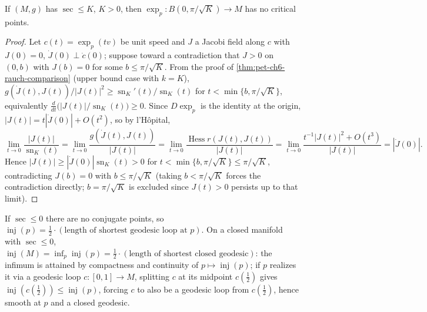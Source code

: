 \begin{theorem}[Theorem 6.4.6]
  \label{thm:pet-ch6-conjugate-radius-bound}
  If $(M,g)$ has $\sec\le K$, $K>0$, then
  $\exp_p:B(0,\pi/\sqrt K)\to M$ has no critical points.
\end{theorem}
\begin{proof}
  Let $c(t)=\exp_p(tv)$ be unit speed and $J$ a Jacobi field along $c$ with
  $J(0)=0$, $\dot J(0)\perp\dot c(0)$; suppose toward a contradiction that
  $J>0$ on $(0,b)$ with $J(b)=0$ for some $b\le\pi/\sqrt K$. From the proof of
  \cref{thm:pet-ch6-rauch-comparison} (upper bound case with $k=K$),
  $g(\dot J(t),J(t))/|J(t)|^2\ge\operatorname{sn}_K'(t)/\operatorname{sn}_K(t)$ for
  $t<\min\{b,\pi/\sqrt K\}$, equivalently
  $\frac{d}{dt}\big(|J(t)|/\operatorname{sn}_K(t)\big)\ge0$. Since $D\exp_p$ is the
  identity at the origin, $|J(t)|=t|\dot J(0)|+O(t^2)$, so by l'H\^opital,
  \[
    \lim_{t\to0}\frac{|J(t)|}{\operatorname{sn}_K(t)}
    =\lim_{t\to0}\frac{g(\dot J(t),J(t))}{|J(t)|}
    =\lim_{t\to0}\frac{\operatorname{Hess}r(J(t),J(t))}{|J(t)|}
    =\lim_{t\to0}\frac{t^{-1}|J(t)|^2+O(t^3)}{|J(t)|}=|\dot J(0)|.
  \]
  Hence $|J(t)|\ge|\dot J(0)|\operatorname{sn}_K(t)>0$ for
  $t<\min\{b,\pi/\sqrt K\}\le\pi/\sqrt K$, contradicting $J(b)=0$ with
  $b\le\pi/\sqrt K$ (taking $b<\pi/\sqrt K$ forces the contradiction directly;
  $b=\pi/\sqrt K$ is excluded since $J(t)>0$ persists up to that limit).
\end{proof}

\begin{remark}
  \label{rem:pet-ch6-injectivity-radius-nonpositive}
  If $\sec\le0$ there are no conjugate points, so
  $\operatorname{inj}(p)=\tfrac12\cdot(\text{length of shortest geodesic loop at }p)$.
  On a closed manifold with $\sec\le0$,
  $\operatorname{inj}(M)=\inf_p\operatorname{inj}(p)=\tfrac12\cdot(\text{length of shortest closed
  geodesic})$: the infimum is attained by compactness and continuity of
  $p\mapsto\operatorname{inj}(p)$; if $p$ realizes it via a geodesic loop $c:[0,1]\to M$,
  splitting $c$ at its midpoint $c(\tfrac12)$ gives
  $\operatorname{inj}(c(\tfrac12))\le\operatorname{inj}(p)$, forcing $c$ to also be a geodesic loop
  from $c(\tfrac12)$, hence smooth at $p$ and a closed geodesic.
\end{remark}

